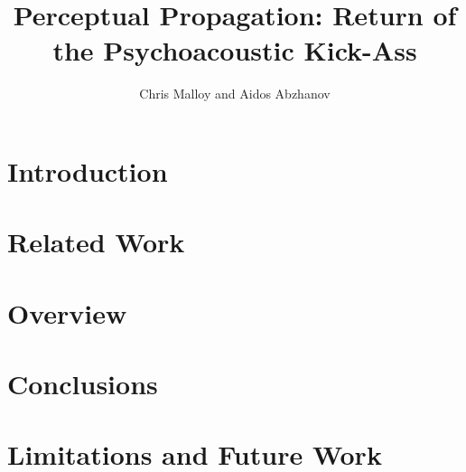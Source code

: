 \documentclass[twocolumn,11pt,notitlepage,oneside]{article}
\title{Perceptual Propagation: Return of the Psychoacoustic Kick-Ass}
\author{Chris Malloy and Aidos Abzhanov}
\date{}
\begin{document}
\maketitle



\section{Introduction}


\section{Related Work}


\section{Overview}


\section{Conclusions}


\section{Limitations and Future Work}



\nocite{*}

\clearpage

\end{document}

